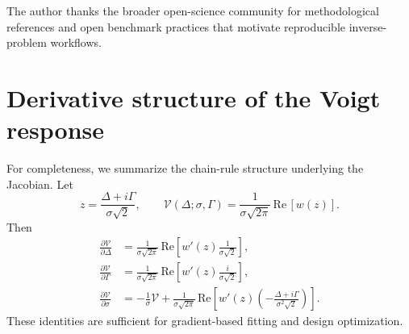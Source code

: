 \documentclass[aps,pre,amsmath,amssymb]{revtex4-2}
\begin{document}
\begin{acknowledgments}
The author thanks the broader open-science community for methodological references and open benchmark practices that motivate reproducible inverse-problem workflows.
\end{acknowledgments}

\appendix
\section{Derivative structure of the Voigt response}
For completeness, we summarize the chain-rule structure underlying the Jacobian. Let
\begin{equation}
z=\frac{\Delta+i\Gamma}{\sigma\sqrt{2}},
\qquad
\mathcal V(\Delta;\sigma,\Gamma)=\frac{1}{\sigma\sqrt{2\pi}}\,\mathrm{Re}\,[w(z)].
\end{equation}
Then
\begin{align}
\frac{\partial \mathcal V}{\partial \Delta}
&=\frac{1}{\sigma\sqrt{2\pi}}\,\mathrm{Re}\!\left[w'(z)\frac{1}{\sigma\sqrt{2}}\right],
\\
\frac{\partial \mathcal V}{\partial \Gamma}
&=\frac{1}{\sigma\sqrt{2\pi}}\,\mathrm{Re}\!\left[w'(z)\frac{i}{\sigma\sqrt{2}}\right],
\\
\frac{\partial \mathcal V}{\partial \sigma}
&=-\frac{1}{\sigma}\mathcal V
+\frac{1}{\sigma\sqrt{2\pi}}\,\mathrm{Re}\!\left[w'(z)\left(-\frac{\Delta+i\Gamma}{\sigma^2\sqrt{2}}\right)\right].
\end{align}
These identities are sufficient for gradient-based fitting and design optimization.
\end{document}

